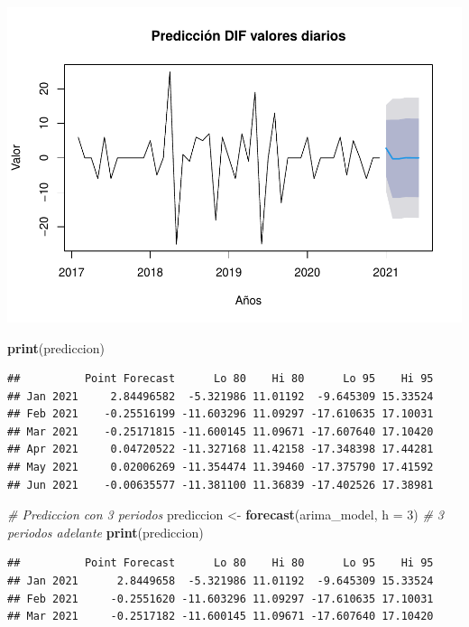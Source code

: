 \documentclass[
]{book}
\newenvironment{Shaded}{\begin{snugshade}}{\end{snugshade}}
\newcommand{\AttributeTok}[1]{\textcolor[rgb]{0.13,0.29,0.53}{#1}}
\newcommand{\CommentTok}[1]{\textcolor[rgb]{0.56,0.35,0.01}{\textit{#1}}}
\newcommand{\DecValTok}[1]{\textcolor[rgb]{0.00,0.00,0.81}{#1}}
\newcommand{\FunctionTok}[1]{\textcolor[rgb]{0.13,0.29,0.53}{\textbf{#1}}}
\newcommand{\NormalTok}[1]{#1}
\newcommand{\OtherTok}[1]{\textcolor[rgb]{0.56,0.35,0.01}{#1}}
\begin{document}
\includegraphics{_main_files/figure-latex/unnamed-chunk-20-1.pdf}

\begin{Shaded}
\begin{Highlighting}[]
\FunctionTok{print}\NormalTok{(prediccion)}
\end{Highlighting}
\end{Shaded}

\begin{verbatim}
##          Point Forecast      Lo 80    Hi 80      Lo 95    Hi 95
## Jan 2021     2.84496582  -5.321986 11.01192  -9.645309 15.33524
## Feb 2021    -0.25516199 -11.603296 11.09297 -17.610635 17.10031
## Mar 2021    -0.25171815 -11.600145 11.09671 -17.607640 17.10420
## Apr 2021     0.04720522 -11.327168 11.42158 -17.348398 17.44281
## May 2021     0.02006269 -11.354474 11.39460 -17.375790 17.41592
## Jun 2021    -0.00635577 -11.381100 11.36839 -17.402526 17.38981
\end{verbatim}

\begin{Shaded}
\begin{Highlighting}[]
\CommentTok{\# Prediccion con 3 periodos}
\NormalTok{prediccion }\OtherTok{\textless{}{-}} \FunctionTok{forecast}\NormalTok{(arima\_model, }\AttributeTok{h =} \DecValTok{3}\NormalTok{) }\CommentTok{\# 3 periodos adelante}
\FunctionTok{print}\NormalTok{(prediccion)}
\end{Highlighting}
\end{Shaded}

\begin{verbatim}
##          Point Forecast      Lo 80    Hi 80      Lo 95    Hi 95
## Jan 2021      2.8449658  -5.321986 11.01192  -9.645309 15.33524
## Feb 2021     -0.2551620 -11.603296 11.09297 -17.610635 17.10031
## Mar 2021     -0.2517182 -11.600145 11.09671 -17.607640 17.10420
\end{verbatim}
\end{document}
